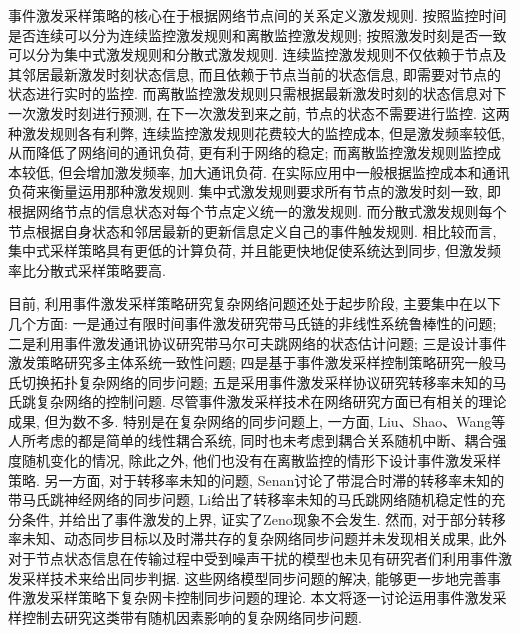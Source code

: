 事件激发采样策略的核心在于根据网络节点间的关系定义激发规则. 按照监控时间是否连续可以分为连续监控激发规则和离散监控激发规则; 按照激发时刻是否一致可以分为集中式激发规则和分散式激发规则. 连续监控激发规则不仅依赖于节点及其邻居最新激发时刻状态信息, 而且依赖于节点当前的状态信息, 即需要对节点的状态进行实时的监控. 而离散监控激发规则只需根据最新激发时刻的状态信息对下一次激发时刻进行预测, 在下一次激发到来之前, 节点的状态不需要进行监控. 这两种激发规则各有利弊, 连续监控激发规则花费较大的监控成本, 但是激发频率较低, 从而降低了网络间的通讯负荷, 更有利于网络的稳定; 而离散监控激发规则监控成本较低, 但会增加激发频率, 加大通讯负荷. 在实际应用中一般根据监控成本和通讯负荷来衡量运用那种激发规则. 集中式激发规则要求所有节点的激发时刻一致, 即根据网络节点的信息状态对每个节点定义统一的激发规则. 而分散式激发规则每个节点根据自身状态和邻居最新的更新信息定义自己的事件触发规则. 相比较而言, 集中式采样策略具有更低的计算负荷, 并且能更快地促使系统达到同步, 但激发频率比分散式采样策略要高.

目前, 利用事件激发采样策略研究复杂网络问题还处于起步阶段, 主要集中在以下几个方面: 一是通过有限时间事件激发研究带马氏链的非线性系统鲁棒性的问题; 二是利用事件激发通讯协议研究带马尔可夫跳网络的状态估计问题; 三是设计事件激发策略研究多主体系统一致性问题; 四是基于事件激发采样控制策略研究一般马氏切换拓扑复杂网络的同步问题; 五是采用事件激发采样协议研究转移率未知的马氏跳复杂网络的控制问题. 尽管事件激发采样技术在网络研究方面已有相关的理论成果, 但为数不多. 特别是在复杂网络的同步问题上, 一方面, Liu、Shao、Wang等人所考虑的都是简单的线性耦合系统, 同时也未考虑到耦合关系随机中断、耦合强度随机变化的情况, 除此之外, 他们也没有在离散监控的情形下设计事件激发采样策略. 另一方面, 对于转移率未知的问题, Senan讨论了带混合时滞的转移率未知的带马氏跳神经网络的同步问题, Li给出了转移率未知的马氏跳网络随机稳定性的充分条件, 并给出了事件激发的上界, 证实了Zeno现象不会发生. 然而, 对于部分转移率未知、动态同步目标以及时滞共存的复杂网络同步问题并未发现相关成果, 此外对于节点状态信息在传输过程中受到噪声干扰的模型也未见有研究者们利用事件激发采样技术来给出同步判据. 这些网络模型同步问题的解决, 能够更一步地完善事件激发采样策略下复杂网卡控制同步问题的理论. 本文将逐一讨论运用事件激发采样控制去研究这类带有随机因素影响的复杂网络同步问题.

